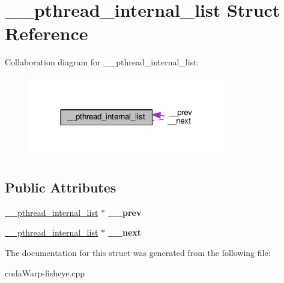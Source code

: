 \hypertarget{struct____pthread__internal__list}{}\section{\+\_\+\+\_\+pthread\+\_\+internal\+\_\+list Struct Reference}
\label{struct____pthread__internal__list}


Collaboration diagram for \+\_\+\+\_\+pthread\+\_\+internal\+\_\+list\+:\nopagebreak
\begin{figure}[H]
\begin{center}
\leavevmode
\includegraphics[width=245pt]{struct____pthread__internal__list__coll__graph}
\end{center}
\end{figure}
\subsection*{Public Attributes}
\begin{DoxyCompactItemize}
\item 
\hyperlink{struct____pthread__internal__list}{\+\_\+\+\_\+pthread\+\_\+internal\+\_\+list} $\ast$ {\bfseries \+\_\+\+\_\+prev}\hypertarget{struct____pthread__internal__list_a1c75514200b551e1f04692aa513b3e49}{}\label{struct____pthread__internal__list_a1c75514200b551e1f04692aa513b3e49}

\item 
\hyperlink{struct____pthread__internal__list}{\+\_\+\+\_\+pthread\+\_\+internal\+\_\+list} $\ast$ {\bfseries \+\_\+\+\_\+next}\hypertarget{struct____pthread__internal__list_a1974e77e45657c35900d596baba9094b}{}\label{struct____pthread__internal__list_a1974e77e45657c35900d596baba9094b}

\end{DoxyCompactItemize}


The documentation for this struct was generated from the following file\+:\begin{DoxyCompactItemize}
\item 
cuda\+Warp-\/fisheye.\+cpp\end{DoxyCompactItemize}
